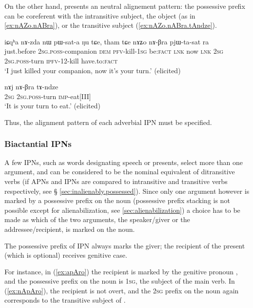 On the other hand,  presents an neutral alignement pattern: the possessive prefix can be coreferent with the intransitive subject, the object (as in \ref{ex:nAZo.nABra}), or the transitive subject (\ref{ex:nAZo.nABra.tAndze}).


\begin{exe}
\ex \label{ex:nAZo.nABra}
\gll iɕqʰa nɤ-zda nɯ pɯ-sat-a ŋu tɕe, tham tɕe nɤʑo nɤ-βra pjɯ-ta-sat ra \\
just.before \textsc{2sg}.\textsc{poss}-companion \textsc{dem} \textsc{pfv}-kill-\textsc{1sg} be:\textsc{fact} \textsc{lnk} now \textsc{lnk} \textsc{2sg} \textsc{2sg}.\textsc{poss}-turn \textsc{ipfv}-1\fl{}2-kill have.to:\textsc{fact} \\
\glt `I just killed your companion, now it's your turn.' (elicited)
\end{exe}

\begin{exe}
\ex \label{ex:nAZo.nABra.tAndze}
\gll nɤj nɤ-βra tɤ-ndze  \\
\textsc{2sg} \textsc{2sg}.\textsc{poss}-turn \textsc{imp}-eat[III] \\
\glt `It is your turn to eat.' (elicited)
\end{exe}

Thus, the alignment pattern of each adverbial IPN must be specified.

\subsubsection{Biactantial IPNs} \label{sec:biactantial.ipn}
A few IPNs, such as words designating speech or presents, select more than one argument, and can be considered to be the nominal equivalent of ditransitive verbs (if APNs and IPNs are compared to intransitive and transitive verbs respectively, see § \ref{sec:inalienably.possessed}). Since only one argument however is marked by a possessive prefix on the noun (possessive prefix stacking is not possible except for alienabilization, see \ref{sec:alienabilization}) a choice has to be made as which of the two arguments, the speaker/giver or the addressee/recipient, is marked on the noun.

The possessive prefix of IPN  always marks the giver; the recipient of the present (which is optional) receives genitive case. 

For instance, in (\ref{ex:apAro}) the recipient is marked by the genitive pronoun , and the possessive prefix on the noun is \textsc{1sg}, the subject of the main verb. In (\ref{ex:nApAro}), the recipient is not overt, and the \textsc{2sg} prefix on the noun again corresponds to the transitive subject of .

